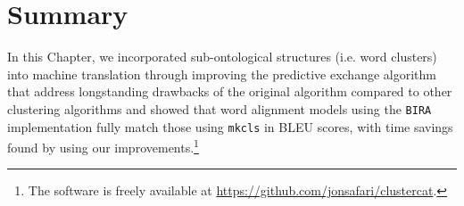 \section{Summary}

In this Chapter, we incorporated sub-ontological structures (i.e. word clusters) into machine translation through improving the predictive exchange algorithm that address longstanding drawbacks of the original algorithm compared to other clustering algorithms and showed that word alignment models using the \texttt{BIRA} implementation fully match those using \texttt{mkcls} in BLEU scores, with time savings found by using our improvements.\footnote{The software is freely available at \url{https://github.com/jonsafari/clustercat}.}


